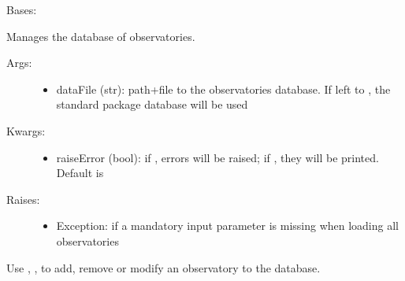 \documentclass[letterpaper,10pt,english]{sphinxmanual}
\begin{document}
\begin{fulllineitems}
\label{astroobs:astroobs.ObservatoryList}
Bases: 

Manages the database of observatories.
\begin{description}
\item[{Args:}] \leavevmode\begin{itemize}
\item {} 
dataFile (str): path+file to the observatories database. If left to , the standard package database will be used

\end{itemize}

\item[{Kwargs:}] \leavevmode\begin{itemize}
\item {} 
raiseError (bool): if , errors will be raised; if , they will be printed. Default is 

\end{itemize}

\item[{Raises:}] \leavevmode\begin{itemize}
\item {} 
Exception: if a mandatory input parameter is missing when loading all observatories

\end{itemize}

\end{description}

Use , ,  to add, remove or modify an observatory to the database.


\end{fulllineitems}
\end{document}
